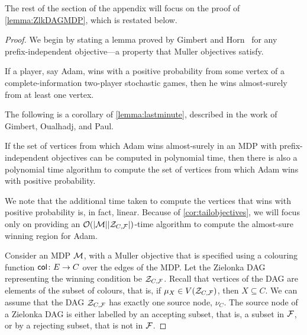 The rest of the section of the appendix will focus on the proof of \cref{lemma:ZlkDAGMDP}, which is restated below.
\ZlkDAGMDP*
\begin{proof}
        We begin by stating a lemma proved by Gimbert and Horn~\cite{GH10} for any prefix-independent objective---a property that Muller objectives satisfy.
        \begin{theorem}\label{lemma:lastminute}\label{lemma:tailobjectives}
            If a player, say Adam, wins with a positive probability from some vertex of a complete-information two-player stochastic games, then he wins almost-surely from at least one vertex.
        \end{theorem}
        The following is a corollary of \cref{lemma:lastminute}, described in the work of Gimbert, Oualhadj, and Paul. 
        \begin{corollary}\label{cor:tailobjectives}
            If the set of vertices from which Adam wins almost-surely in an MDP with prefix-independent objectives can be computed in polynomial time, then there is also a polynomial time algorithm to compute the set of vertices from which Adam wins with positive probability. %
        \end{corollary}
       We note that the additional time taken to compute the vertices that wins with positive probability is, in fact, linear. 
        Because of \cref{cor:tailobjectives}, we will focus only on providing an $\mathcal{O}(|\mathcal{M}||\mathcal{Z}_{C,\mathcal{F}}|)$-time algorithm to compute the almost-sure winning region for Adam. 
        
        Consider an MDP $\mathcal{M}$, with a Muller objective that is specified using a colouring function  ${\mathsf{col}} \colon E \rightarrow C$ over the edges of the MDP. 
        Let the Zielonka DAG representing the winning condition be $\mathcal{Z}_{C,\mathcal{F}}$. Recall that vertices of the DAG are elements of the subset of colours, that is, if $\mu_X\in V(\mathcal{Z}_{C,\mathcal{F}})$, then $X\subseteq C$. We can assume that the DAG $\mathcal{Z}_{C,\mathcal{F}}$ has exactly one source node, $\nu_C$. The source node of a Zielonka DAG is either labelled by an accepting subset, that is, a subset  in $\mathcal{F}$, or by a rejecting subset, that is not in $\mathcal{F}$. %

\end{proof}
